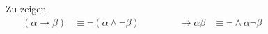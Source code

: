 \documentclass[english,ngerman,parskip=half,headsepline,footsepline,
	fleqn,notitlepage]{scrreprt}
\newcommand*{\defeq}{:=}%
\newcommand*{\ladd}{+}
\newcommand*{\lmult}{\cdot}
\newcommand*{\ltrue}{\top}%
\newcommand*{\lfalse}{\bot}%
\newcommand*{\lrep}{\leftarrow}%
\newcommand*{\limp}{\rightarrow}%
\newcommand*{\lequiv}{\leftrightarrow}%
\newcommand*{\lnand}{\uparrow}%
\newcommand*{\lnor}{\downarrow}%
\newcommand*{\formulatoleft}{&&&&&&&&&&}%
\newcommand*{\formulaspace}{&&&&}%
\newcommand*{\subsubsectionname}{Paragraph}
\begin{document}
	Zu zeigen
	\begin{align}
		(\alpha\limp\beta)&\equiv\lnot(\alpha\land\lnot\beta)
		\formulaspace
		&\limp\alpha\beta&\equiv\lnot\land\alpha\lnot\beta
		\formulatoleft
	\end{align}

\end{document}
